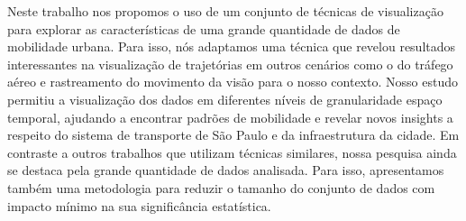 Neste trabalho nos propomos o uso de um conjunto de técnicas de visualização
para explorar as características de uma grande quantidade de dados de
mobilidade urbana. Para isso, nós adaptamos uma técnica que revelou resultados
interessantes na visualização de trajetórias em outros cenários como o do
tráfego aéreo e rastreamento do movimento da visão para o nosso contexto.
Nosso estudo permitiu a visualização dos dados em diferentes níveis de
granularidade espaço temporal, ajudando a encontrar padrões de mobilidade e
revelar novos insights a respeito do sistema de transporte de S\~ao Paulo e da
infraestrutura da cidade. Em contraste a outros trabalhos que utilizam técnicas
similares, nossa pesquisa ainda se destaca pela grande quantidade de dados
analisada. Para isso, apresentamos também uma metodologia para reduzir o tamanho
do conjunto de dados com impacto mínimo na sua significância estatística.
